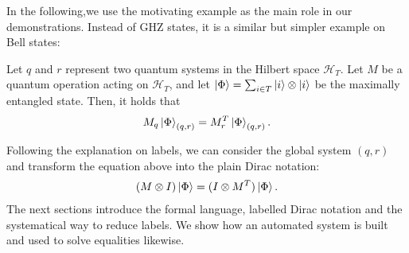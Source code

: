 In the following,we use the motivating example as the main role in our demonstrations.
Instead of GHZ states, it is a similar but simpler example on Bell states:
\begin{example}
    \label{ex: motivating}
    Let \( q \) and \( r \) represent two quantum systems in the Hilbert space \( \mathcal{H}_T \). Let \( M \) be a quantum operation acting on \( \mathcal{H}_T \), and let \( \ket{\Phi} = \sum_{i \in T} \ket{i} \otimes \ket{i} \) be the maximally entangled state. Then, it holds that
    \[
    M_q \ket{\Phi}_{(q, r)} = M_r^T \ket{\Phi}_{(q, r)}.
    \]
\end{example}
Following the explanation on labels, we can consider the global system $(q,r)$ and transform the equation above into the plain Dirac notation:
\begin{align}
    (M \otimes I) \ket{\Phi} = (I \otimes M^T) \ket{\Phi}.
    \label{eq: motivating plain}
\end{align}
The next sections introduce the formal language, labelled Dirac notation and the systematical way to reduce labels.
We show how an automated system is built and used to solve equalities likewise.



